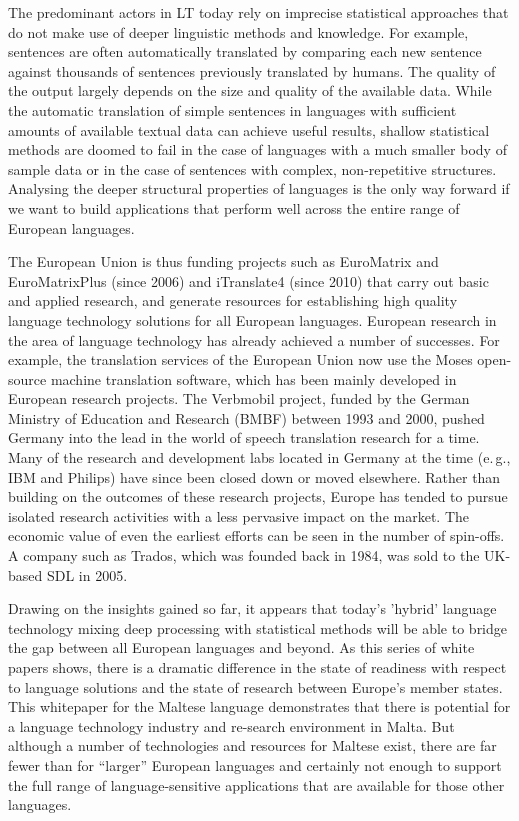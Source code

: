 \documentclass[]{../../metanetpaper}
\begin{document}
\begin{multicols}{2}
The predominant actors in LT today rely on imprecise statistical approaches that do not make use of deeper linguistic methods and knowledge. For example, sentences are often automatically translated by comparing each new sentence against thousands of sentences previously translated by humans. The quality of the output largely depends on the size and quality of the available  data. While the automatic translation of simple sentences in languages with sufficient amounts of available textual data can achieve useful results, shallow statistical methods are doomed to fail in the case of languages with a much smaller body of sample data or in the case of sentences with complex, non-repetitive structures. Analysing the deeper structural properties of languages is the only way forward if we want to build applications that perform well across the entire range of European languages.


The European Union is thus funding projects such as EuroMatrix and EuroMatrixPlus (since 2006) and iTranslate4 (since 2010) that carry out basic and applied research, and generate resources for establishing high quality language technology solutions for all European languages. 
European research in the area of language technology has already achieved a number of successes. For example, the translation services of the European Union now use the Moses open-source machine translation software, which has been mainly developed in European research projects. The Verbmobil project, funded by the German Ministry of Education and Research (BMBF) between 1993 and 2000, pushed Germany into the lead in the world of speech translation research for a time. Many of the research and development labs located in Germany at the time (e.\,g., IBM and Philips) have since been closed down or moved elsewhere. Rather than building on the outcomes of these research projects, Europe has tended to pursue isolated research activities with a less pervasive impact on the market. The economic value of even the earliest efforts can be seen in the number of spin-offs. A company such as Trados, which was founded back in 1984, was sold to the UK-based SDL in 2005.


Drawing on the insights gained so far, it appears that today’s 'hybrid' language technology mixing deep processing with statistical methods will be able to bridge the gap between all European languages and beyond. As this series of white papers shows, there is a dramatic difference in the state of readiness with respect to language solutions and the state of research between Europe’s member states. This whitepaper for the Maltese language demonstrates that there is potential for a language technology industry and re-search environment in Malta. But although a number of technologies and resources for Maltese exist, there are far fewer than for “larger” European languages and certainly not enough to support the full range of language-sensitive applications that are available for those other languages.


\end{multicols}
\end{document}
